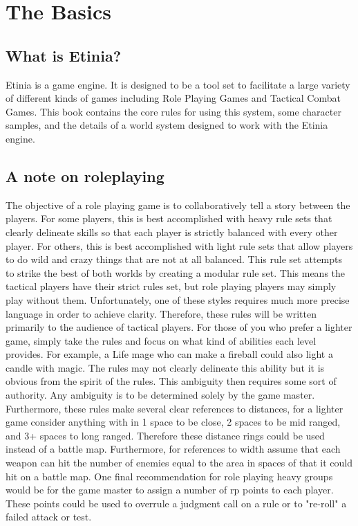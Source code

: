 \chapter{The Basics}
\section{What is Etinia?}
Etinia is a game engine.  It is designed to be a tool set to facilitate a large
variety of different kinds of games including Role Playing Games and Tactical
Combat Games.  This book contains the core rules for using this system, some
character samples, and the details of a world system designed to work with the
Etinia engine.
\section{A note on roleplaying}
The objective of a role playing game is to collaboratively tell a story between
the players.  For some players, this is best accomplished with heavy rule sets
that clearly delineate skills so that each player is strictly balanced with
every other player.  For others, this is best accomplished with light rule sets
that allow players to do wild and crazy things that are not at all balanced.
This rule set attempts to strike the best of both worlds by creating a modular
rule set.  This means the tactical players have their strict rules set, but
role playing players may simply play without them.  Unfortunately, one of these
styles requires much more precise language in order to achieve clarity.
Therefore, these rules will be written primarily to the audience of tactical
players.  For those of you who prefer a lighter game, simply take the rules and
focus on what kind of abilities each level provides.  For example, a Life mage
who can make a fireball could also light a candle with magic.  The rules may
not clearly delineate this ability but it is obvious from the spirit of the
rules.  This ambiguity then requires some sort of authority.  Any ambiguity is
to be determined solely by the game master.  Furthermore, these rules make
several clear references to distances, for a lighter game consider anything
with in 1 space to be close, 2 spaces to be mid ranged, and 3+ spaces to long
ranged.  Therefore these distance rings could be used instead of a battle map.
Furthermore, for references to width assume that each weapon can hit the number
of enemies equal to the area in spaces of that it could hit on a battle map.
One final recommendation for role playing heavy groups would be for the game
master to assign a number of rp points to each player.  These points could be
used to overrule a judgment call on a rule or to "re-roll" a failed attack or
test.

